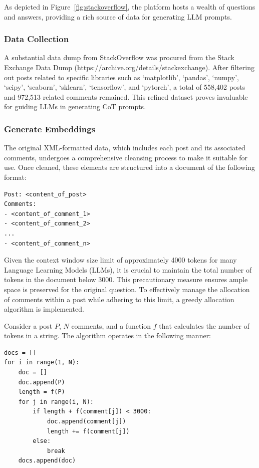 \documentclass[a4paper,oneside]{book}
\begin{document}
As depicted in Figure~\ref{fig:stackoverflow}, the platform hosts a wealth of questions and answers, providing a rich source of data for generating LLM prompts.

\subsubsection{Data Collection}
A substantial data dump from StackOverflow was procured from the Stack Exchange Data Dump (https://archive.org/details/stackexchange). After filtering out posts related to specific libraries such as `matplotlib', `pandas', `numpy', `scipy', `seaborn', `sklearn', `tensorflow', and `pytorch', a total of 558,402 posts and 972,513 related comments remained. This refined dataset proves invaluable for guiding LLMs in generating CoT prompts.

\subsubsection{Generate Embeddings}
The original XML-formatted data, which includes each post and its associated comments, undergoes a comprehensive cleansing process to make it suitable for use. Once cleaned, these elements are structured into a document of the following format:

\begin{verbatim}
Post: <content_of_post>
Comments:
- <content_of_comment_1>
- <content_of_comment_2>
...
- <content_of_comment_n>
\end{verbatim}

Given the context window size limit of approximately 4000 tokens for many Language Learning Models (LLMs), it is crucial to maintain the total number of tokens in the document below 3000. This precautionary measure ensures ample space is preserved for the original question. To effectively manage the allocation of comments within a post while adhering to this limit, a greedy allocation algorithm is implemented.

Consider a post $P$, $N$ comments, and a function $f$ that calculates the number of tokens in a string. The algorithm operates in the following manner:

\begin{verbatim}
docs = []
for i in range(1, N):
    doc = []
    doc.append(P)
    length = f(P)
    for j in range(i, N):
        if length + f(comment[j]) < 3000:
            doc.append(comment[j])
            length += f(comment[j])
        else:
            break
    docs.append(doc)
\end{verbatim}
\end{document}

